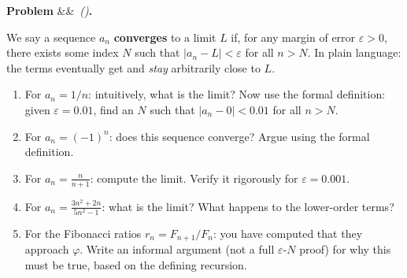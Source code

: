 \documentclass[12pt, a4paper]{article}
\newcounter{problem}
\newenvironment{problem}[1][]{%
  \refstepcounter{problem}%
  \par\vspace{6pt}%
  \noindent\textbf{\color{MidBlue}Problem \theproblem}%
  \ifx&#1&\else\ \textit{(#1)}\fi\textbf{.}\enskip
}{\par\vspace{4pt}}
\begin{document}
\begin{center}
\end{center}

\begin{problem}
\label{prob:limit_intuition}
We say a sequence $a_n$ \textbf{converges} to a limit $L$ if, for any margin of error $\varepsilon > 0$, there exists some index $N$ such that $|a_n - L| < \varepsilon$ for all $n > N$. In plain language: the terms eventually get and \emph{stay} arbitrarily close to $L$.
\begin{enumerate}[label=(\alph*), topsep=2pt]
  \item For $a_n = 1/n$: intuitively, what is the limit? Now use the formal definition: given $\varepsilon = 0.01$, find an $N$ such that $|a_n - 0| < 0.01$ for all $n > N$.
  \item For $a_n = (-1)^n$: does this sequence converge? Argue using the formal definition.
  \item For $a_n = \frac{n}{n+1}$: compute the limit. Verify it rigorously for $\varepsilon = 0.001$.
  \item For $a_n = \frac{3n^2 + 2n}{5n^2 - 1}$: what is the limit? What happens to the lower-order terms?
  \item For the Fibonacci ratios $r_n = F_{n+1}/F_n$: you have computed that they approach $\varphi$. Write an informal argument (not a full $\varepsilon$-$N$ proof) for why this must be true, based on the defining recursion.
\end{enumerate}
\end{problem}
\end{document}
